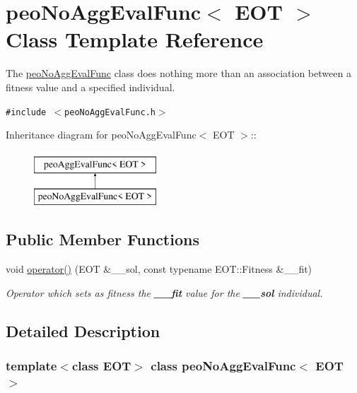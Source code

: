 \hypertarget{classpeoNoAggEvalFunc}{
\section{peo\-No\-Agg\-Eval\-Func$<$ EOT $>$ Class Template Reference}
\label{classpeoNoAggEvalFunc}
}
The \hyperlink{classpeoNoAggEvalFunc}{peo\-No\-Agg\-Eval\-Func} class does nothing more than an association between a fitness value and a specified individual.  


{\tt \#include $<$peo\-No\-Agg\-Eval\-Func.h$>$}

Inheritance diagram for peo\-No\-Agg\-Eval\-Func$<$ EOT $>$::\begin{figure}[H]
\begin{center}
\leavevmode
\includegraphics[height=2cm]{classpeoNoAggEvalFunc}
\end{center}
\end{figure}
\subsection*{Public Member Functions}
\begin{CompactItemize}
\item 
\hypertarget{classpeoNoAggEvalFunc_1a69ee1af8745ac75c864bf884436de5}{
void \hyperlink{classpeoNoAggEvalFunc_1a69ee1af8745ac75c864bf884436de5}{operator()} (EOT \&\_\-\_\-sol, const typename EOT::Fitness \&\_\-\_\-fit)}
\label{classpeoNoAggEvalFunc_1a69ee1af8745ac75c864bf884436de5}

\begin{CompactList}\small\item\em Operator which sets as fitness the {\bf \_\-\_\-fit} value for the {\bf \_\-\_\-sol} individual. \item\end{CompactList}\end{CompactItemize}


\subsection{Detailed Description}
\subsubsection*{template$<$class EOT$>$ class peo\-No\-Agg\-Eval\-Func$<$ EOT $>$}

